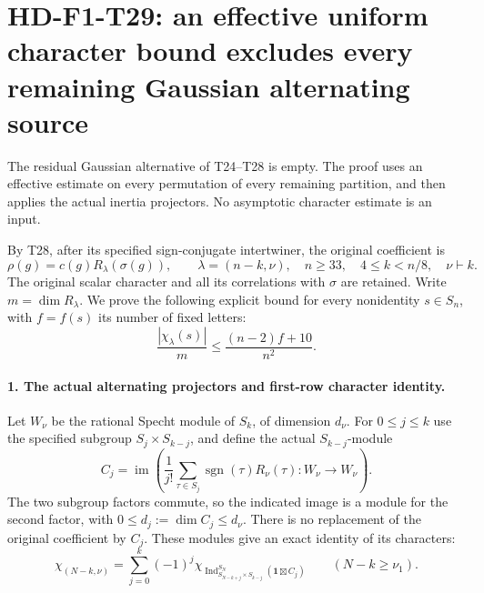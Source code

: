 \section[HD-F1-T29: uniform exclusion of the remaining Gaussian Specht sources]{HD-F1-T29: an effective uniform character bound excludes every remaining Gaussian alternating source}
\label{sec:f1-gaussian-uniform}

The residual Gaussian alternative of T24--T28 is empty.
The proof uses an effective estimate on every permutation of every
remaining partition, and then applies the actual inertia projectors.
No asymptotic character estimate is an input.

By T28, after its specified sign-conjugate intertwiner, the original
coefficient is
\[
 \rho(g)=c(g)R_\lambda(\sigma(g)),\qquad
 \lambda=(n-k,\nu),\quad
 n\ge33,\quad 4\le k<n/8,\quad \nu\vdash k .
 \tag{F1T29.1}
\]
The original scalar character and all its correlations with
$\sigma$ are retained. Write $m=\dim R_\lambda$.
We prove the following explicit bound for every nonidentity
$s\in S_n$, with $f=f(s)$ its number of fixed letters:
\[
 \boxed{\quad
 \frac{|\chi_\lambda(s)|}{m}
       \le\frac{(n-2)f+10}{n^2}.
 \quad}
 \tag{F1T29.2}
\]

\paragraph{1. The actual alternating projectors and first-row character identity.}
Let $W_\nu$ be the rational Specht module of $S_k$, of dimension
$d_\nu$. For $0\le j\le k$ use the specified subgroup
$S_j\times S_{k-j}$, and define the actual $S_{k-j}$-module
\[
 C_j=\operatorname{im}\!\left(
       \frac1{j!}\sum_{\tau\in S_j}\operatorname{sgn}(\tau)R_\nu(\tau)
                            :W_\nu\longrightarrow W_\nu\right).
 \tag{F1T29.3}
\]
The two subgroup factors commute, so the indicated image is a
module for the second factor, with $0\le d_j:=\dim C_j\le d_\nu$.
There is no replacement of the original coefficient by $C_j$.
These modules give an exact identity of its characters:
\[
 \chi_{(N-k,\nu)}
   =\sum_{j=0}^k(-1)^j
       \chi_{\operatorname{Ind}_{S_{N-k+j}\times S_{k-j}}^{S_N}
                      (\mathbf1\boxtimes C_j)}
       \qquad(N-k\ge\nu_1).
 \tag{F1T29.4}
\]

